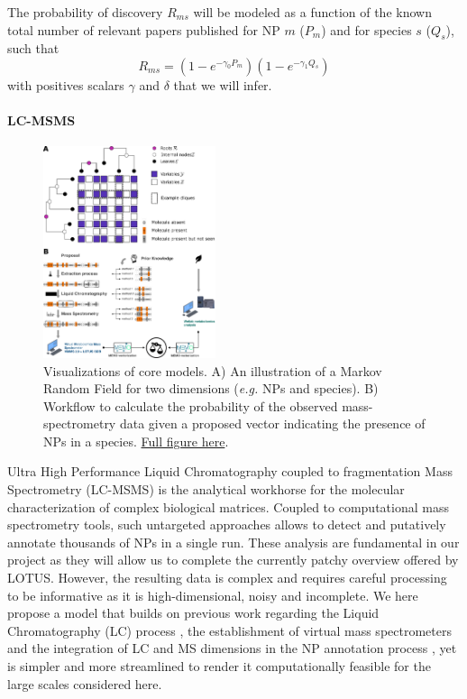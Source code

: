 \documentclass[
11pt, %
oneside, %
english, %
singlespacing, %
headsepline, %
chapterinoneline, %
]{MastersDoctoralThesis} %
\begin{document}
The probability of discovery $R_{ms}$ will be modeled as a function of the known total number of relevant papers published for NP $m$ ($P_m$) and for species $s$ ($Q_s$), such that
\begin{equation*}
	R_{ms} = (1 - e^{-\gamma_0 P_m })  (1 - e^{-\gamma_1 Q_s})
\end{equation*}
with positives scalars $\gamma$ and $\delta$ that we will infer.

\paragraph{LC-MSMS}\label{sec:ModellingLCMS}

\begin{figure}
	\centering
	\includegraphics[width=0.45\textwidth]{./images/method_figure_complete_vertical.pdf}
	\caption{Visualizations of core models. A) An illustration of a Markov Random Field for two dimensions (\textit{e.g.} NPs and species). B) Workflow to calculate the probability of the observed mass-spectrometry data given a proposed vector indicating the presence of NPs in a species. \href{https://commons-research.github.io/snf-anticipating-the-chemistry-of-life/method_figure_complete_vertical.pdf}{Full figure here}.}
	\label{fig:method-overview}
\end{figure}


Ultra High Performance Liquid Chromatography coupled to fragmentation Mass Spectrometry (LC-MSMS) is the analytical workhorse for the molecular characterization of complex biological matrices. Coupled to computational mass spectrometry tools, such untargeted approaches allows to detect and putatively annotate thousands of NPs in a single run. These analysis are fundamental in our project as they will allow us to complete the currently patchy overview offered by LOTUS. However, the resulting data is complex and requires careful processing to be informative as it is high-dimensional, noisy and incomplete. We here propose a model that builds on previous work regarding the Liquid Chromatography (LC) process \cite{heymann_2023,wiczling_2021}, the establishment of virtual mass spectrometers \cite{wandy_2019,wandy_2022,wandy_2023} and the integration of LC and MS dimensions in the NP annotation process \cite{bach_2021, bach_2022}, yet is simpler and more streamlined to render it computationally feasible for the large scales considered here.
\end{document}
